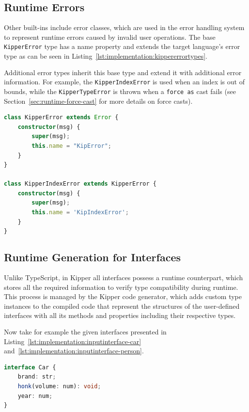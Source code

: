 \subsection{Runtime Errors}

Other built-ins include error classes, which are used in the error handling system to represent runtime errors caused by invalid user operations. The base \lstinline|KipperError| type has a name property and extends the target language's error type as can be seen in Listing~\ref{lst:implementation:kippererrortypes}. 

Additional error types inherit this base type and extend it with additional error information. For example, the \lstinline|KipperIndexError| is used when an index is out of bounds, while the \lstinline|KipperTypeError| is thrown when a \lstinline|force as| cast fails (see Section~\ref{sec:runtime-force-cast} for more details on force casts).

\begin{lstlisting}[language=Typescript,caption=Kipper error types,label=lst:implementation:kippererrortypes]
class KipperError extends Error {
	constructor(msg) {
		super(msg);
		this.name = "KipError";
	}
}

class KipperIndexError extends KipperError {
	constructor(msg) { 
		super(msg); 
		this.name = 'KipIndexError'; 
	} 
}
\end{lstlisting}

\subsection{Runtime Generation for Interfaces}
\label{sec:runtime-interfaces}

Unlike TypeScript, in Kipper all interfaces possess a runtime counterpart, which stores all the required information to verify type compatibility during runtime. This process is managed by the Kipper code generator, which adds custom type instances to the compiled code that represent the structures of the user-defined interfaces with all its methods and properties including their respective types.

Now take for example the given interfaces presented in Listing~\ref{lst:implementation:inputinterface-car} and~\ref{lst:implementation:inputinterface-person}.

\begin{lstlisting}[language=Typescript,caption=Example interface \lstinline|Car| in the Kipper language,label=lst:implementation:inputinterface-car]
interface Car {
	brand: str;
	honk(volume: num): void;
	year: num;
}
\end{lstlisting}

